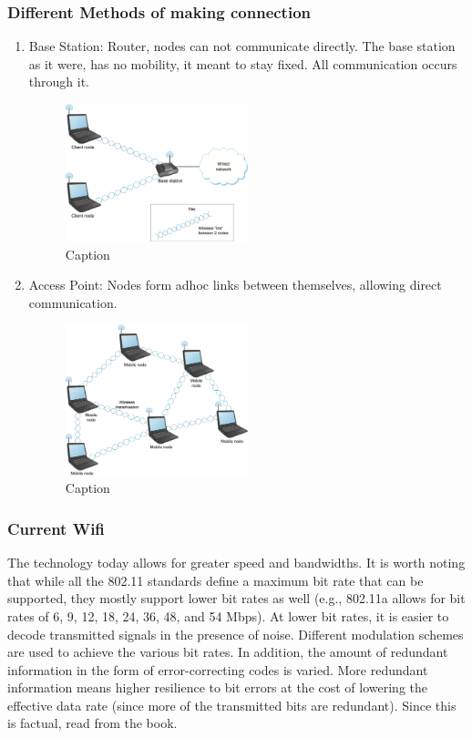 \documentclass[11pt, a4paper]{article}
\begin{document}
\subsubsection{Different Methods of making connection}
\begin{enumerate}
    \item Base Station: Router, nodes can not communicate directly. The base station as it were, has no mobility, it meant to stay fixed. All communication occurs through it.
    \begin{figure}[H]
        \centering
        \includegraphics[width = 0.5\textwidth]{Pictures/Wireless base station.png}
        \caption{Caption}
        \label{fig:my_label}
    \end{figure}
    \item Access Point: Nodes form adhoc links between themselves, allowing direct communication.
    \begin{figure}[H]
        \centering
        \includegraphics[width = 0.5\textwidth]{Pictures/Wireless mesh adhoc.png}
        \caption{Caption}
        \label{fig:my_label}
    \end{figure}
\end{enumerate}

\subsubsection{Current Wifi}
The technology today allows for greater speed and bandwidths. It is worth noting that while all the 802.11 standards define a maximum bit rate that can be supported, they mostly support lower bit rates as well (e.g., 802.11a allows for bit rates of 6, 9, 12, 18, 24, 36, 48, and 54 Mbps). At lower bit rates, it is easier to decode transmitted signals in the presence of noise. Different modulation schemes are used to achieve the various bit rates. In addition, the amount of redundant information in the form of error-correcting codes is varied. More redundant information means higher resilience to bit errors at the cost of lowering the effective data rate (since more of the transmitted bits are redundant). Since this is factual, read from the book.
\end{document}

